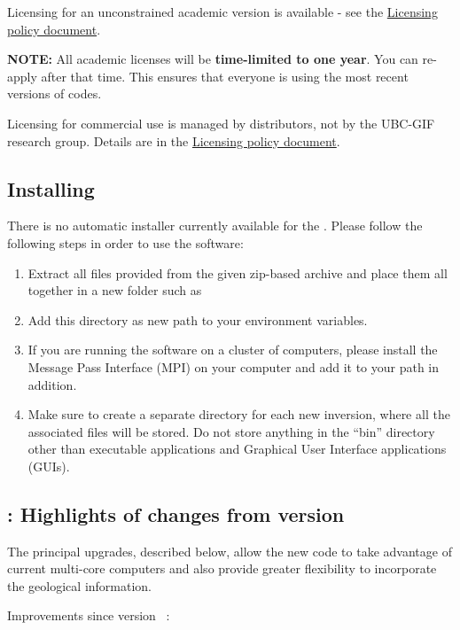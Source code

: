 Licensing for an unconstrained academic version is available - see the \href{http://gif.eos.ubc.ca/software/licensing}{Licensing policy document}.

\textbf{NOTE:} All academic licenses will be \textbf{time-limited to one year}. You can re-apply after that time. This ensures that everyone is using the most recent versions of codes.

Licensing for commercial use is managed by distributors, not by the UBC-GIF research group. Details are in the \href{http://gif.eos.ubc.ca/software/licensing}{Licensing policy document}.

\subsection{Installing \prog}

There is no automatic installer currently available for the \prog. Please follow the following steps in order to use the software:

\begin{enumerate}
\item Extract all files provided from the given zip-based archive and place them all together in a new folder such as 
\item Add this directory as new path to your environment variables.
\item If you are running the software on a cluster of computers, please install the Message Pass Interface (MPI) on your computer and add it to your path in addition.
\item Make sure to create a separate directory for each new inversion, where all the associated files will be stored. Do not store anything in the ``bin'' directory other than executable applications and Graphical User Interface applications (GUIs).
\end{enumerate}

\subsection{\prog: Highlights of changes from version \preV}

The principal upgrades, described below, allow the new code to take advantage of current multi-core computers and also provide greater flexibility to incorporate the geological information.

Improvements since version \preV~:


